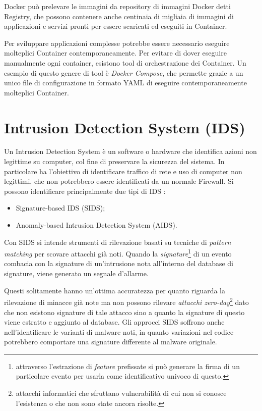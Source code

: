 Docker può prelevare le immagini da repository di immagini Docker detti Registry, che possono contenere anche centinaia di migliaia di immagini di applicazioni e servizi pronti per essere scaricati ed eseguiti in Container.

Per sviluppare applicazioni complesse  potrebbe essere necessario eseguire molteplici Container contemporaneamente. Per evitare di dover eseguire manualmente ogni container, esistono tool di orchestrazione dei Container. Un esempio di questo genere di tool è \textit{Docker Compose}, che permette grazie a un unico file di configurazione in formato YAML di eseguire contemporaneamente  molteplici Container.
\clearpage
\chapter{Intrusion Detection System (IDS)}
\label{IDS}
Un Intrusion Detection System è un software o hardware che identifica azioni non legittime su computer, col fine di preservare la sicurezza del sistema. In particolare ha l'obiettivo di identificare traffico di rete e uso di computer non legittimi, che non potrebbero essere identificati da un normale Firewall. Si possono identificare principalmente due tipi di IDS \cite{khraisat2019survey}:
\begin{itemize}
    \item Signature-based IDS (SIDS);
    \item Anomaly-based Intrusion Detection System (AIDS).
\end{itemize}

Con SIDS si intende strumenti di rilevazione basati su tecniche di \textit{pattern matching} per scovare attacchi già noti. Quando la \textit{signature}\footnote{attraverso l'estrazione di \textit{feature} prefissate si può generare la firma  di un particolare evento per usarla come identificativo univoco di questo.} di un evento combacia con la signature di un'intrusione nota all'interno del database di signature, viene generato un segnale d'allarme.

Questi solitamente hanno un'ottima accuratezza per quanto riguarda la rilevazione di minacce già note ma non possono rilevare \textit{attacchi zero-day}\footnote{attacchi informatici che sfruttano vulnerabilità di cui non si conosce l'esistenza o che non sono state ancora risolte.} dato che non esistono signature di tale attacco sino a quanto la signature di questo viene estratto e aggiunto al database.
Gli approcci SIDS soffrono anche nell'identificare le varianti di malware noti, in quanto variazioni nel codice potrebbero comportare una signature differente al malware originale.

